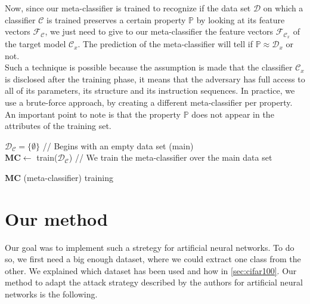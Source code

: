 \documentclass{article}
\begin{document}
Now, since our meta-classifier is trained to recognize if the data set \(\mathcal{D}\) on which a classifier \(\mathcal{C}\) is trained preserves a certain property \(\mathbb{P}\) by looking at its feature vectors \(\mathcal{F}_{\mathcal{C}}\), we just need to give to our meta-classifier the feature vectors \(\mathcal{F}_{\mathcal{C}_x}\) of the target model \(\mathcal{C}_x\). The prediction of the meta-classifier will tell if \( \mathbb{P} \approx \mathcal{D}_x \) or not.\\

Such a technique is possible because the assumption is made that the classifier \( \mathcal{C}_x \) is disclosed after the training phase, it means that the adversary has full access to all of its parameters, its structure and its instruction sequences. In practice, we use a brute-force approach, by creating a different meta-classifier per property. An important point to note is that the property \(\mathbb{P}\) does not appear in the attributes of the training set.\\

\begin{algorithm}[H]
	\SetAlgoLined
	\(\mathcal{D}_{\mathcal{C}} = \{ \emptyset \}\) {\small \color{main}// Begins with an empty data set (main)} \\
	\( \mathbf{MC} \longleftarrow \) train(\( \mathcal{D}_{\mathcal{C}} \)) {\small \color{main}// We train the meta-classifier over the main data set}
	\caption{\(\mathbf{MC}\) (meta-classifier) training}
	\label{algo_mc}
\end{algorithm}

\section{Our method}
Our goal was to implement such a stretegy for artificial neural networks. To do so, we first need a big enough dataset, where we could extract one class from the other. We explained which dataset has been used and how in \ref{sec:cifar100}. Our method to adapt the attack strategy described by the authors for artificial neural networks is the following.\\
\end{document}

